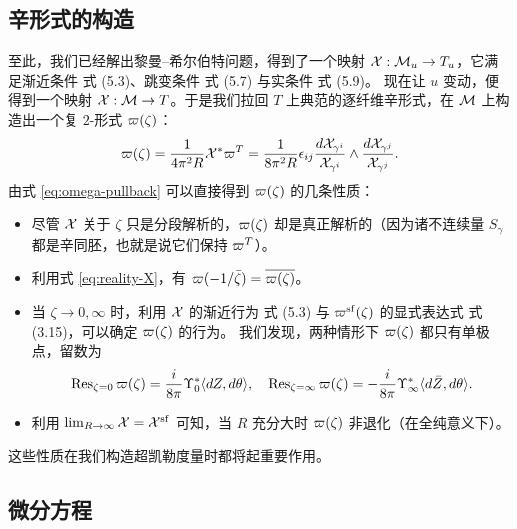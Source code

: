 \subsection{辛形式的构造}
\label{sec:symplectic-form}

至此，我们已经解出黎曼--希尔伯特问题，得到了一个映射 $\mathcal{X}:\mathcal{M}_u\to T_u$，它满足渐近条件 式 (5.3)、跳变条件 式 (5.7) 与实条件 式 (5.9)。%
现在让 $u$ 变动，便得到一个映射 $\mathcal{X}:\mathcal{M}\to T$。于是我们拉回 $T$ 上典范的逐纤维辛形式，在 $\mathcal{M}$ 上构造出一个复 $2$-形式 $\varpi(\zeta)$：
\begin{equation} \label{eq:omega-pullback}
\varpi(\zeta) = \frac{1}{4 \pi^2 R} \mathcal{X}^* \varpi^T = \frac{1}{8 \pi^2 R} \epsilon_{ij} \frac{d\mathcal{X}_{\gamma^i}}{\mathcal{X}_{\gamma^i}} \wedge \frac{d\mathcal{X}_{\gamma^j}}{\mathcal{X}_{\gamma^j}}.
\end{equation}
由式 \eqref{eq:omega-pullback} 可以直接得到 $\varpi(\zeta)$ 的几条性质：
\begin{itemize}
\item 尽管 $\mathcal{X}$ 关于 $\zeta$ 只是分段解析的，$\varpi(\zeta)$ 却是真正解析的（因为诸不连续量 $S_\gamma$ 都是辛同胚，也就是说它们保持 $\varpi^T$）。

\item 利用式 \eqref{eq:reality-X}，有 $\varpi(- 1 / \bar\zeta) = \overline {\varpi(\zeta)}$。

\item 当 $\zeta \to 0,\infty$ 时，利用 $\mathcal{X}$ 的渐近行为 式 (5.3) 与 $\varpi^{\mathrm{sf}}(\zeta)$ 的显式表达式 式 (3.15)，可以确定 $\varpi(\zeta)$ 的行为。%
我们发现，两种情形下 $\varpi(\zeta)$ 都只有单极点，留数为
\begin{equation} \label{eq:omega-residues}
\operatorname{Res}_{\zeta = 0} \varpi(\zeta) = \frac{i}{8 \pi} \Upsilon_0^*\langle dZ, d\theta \rangle, \quad \operatorname{Res}_{\zeta = \infty} \varpi(\zeta) = -\frac{i}{8 \pi} \Upsilon_\infty^*\langle d\bar Z, d\theta \rangle.
\end{equation}

\item 利用 $\lim_{R \to \infty} \mathcal{X} = \mathcal{X}^{\mathrm{sf}}$ 可知，当 $R$ 充分大时 $\varpi(\zeta)$ 非退化（在全纯意义下）。
\end{itemize}
这些性质在我们构造超凯勒度量时都将起重要作用。

\subsection{微分方程}
\label{sec:differential-problem}

